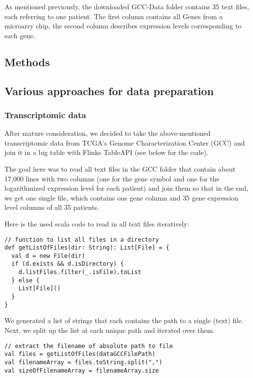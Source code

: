 \documentclass{bioinfo}
\begin{document}
As mentioned previously, the downloaded GCC-Data folder contains 35 text files, each referring to one patient. The first column contains all Genes from a microarry chip, the second column describes expression levels corresponding to each gene.


\begin{methods}
\section{Methods}

\subsection{Various approaches for data preparation}

\subsubsection{Transcriptomic data}
After mature consideration, we decided to take the above-mentioned transcriptomic data from TCGA's Genome Characterization Center (GCC) and join it in a big table with Flinks TableAPI (see below for the code).

The goal here was to read all text files in the GCC folder that contain about 17,000 lines with two columns (one for the gene symbol and one for the logarithmized expression level for each patient) and join them so that in the end, we get one single file, which contains one gene column and 35 gene expression level columns of all 35 patients.

Here is the used scala code to read in all text files iteratively:

\begin{verbatim}
// function to list all files in a directory
def getListOfFiles(dir: String): List[File] = {
  val d = new File(dir)
  if (d.exists && d.isDirectory) {
    d.listFiles.filter(_.isFile).toList
  } else {
    List[File]()
  }
}
\end{verbatim}

We generated a list of strings that each contains the path to a single (text) file.
Next, we split up the list at each unique path and iterated over them.

\begin{verbatim}
// extract the filename of absolute path to file 
val files = getListOfFiles(dataGCCFilePath)
val filenameArray = files.toString.split(",")
val sizeOfFilenameArray = filenameArray.size
\end{verbatim}


\end{methods}
\end{document}
